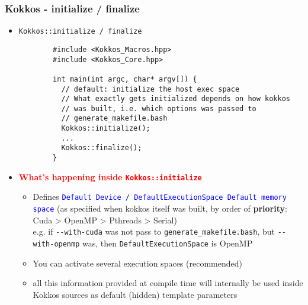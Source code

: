 \begin{frame}[fragile=singleslide]
  \frametitle{Kokkos - initialize / finalize}

  \begin{itemize}
  \item \texttt{Kokkos::initialize / finalize}
    {\small\begin{verbatim}
        #include <Kokkos_Macros.hpp>
        #include <Kokkos_Core.hpp>
        
        int main(int argc, char* argv[]) {
          // default: initialize the host exec space
          // What exactly gets initialized depends on how kokkos
          // was built, i.e. which options was passed to
          // generate_makefile.bash
          Kokkos::initialize();
          ...
          Kokkos::finalize();
        }
      \end{verbatim}
    }
  \item \textcolor{red}{\textbf{What's happening inside \texttt{Kokkos::initialize}}}
    \begin{itemize}
    \item Defines \textcolor{blue}{\texttt{Default Device / DefaultExecutionSpace Default memory space}} (as specified when kokkos itself was built, by order of {\bf priority}: Cuda > OpenMP > Pthreads > Serial)\\
      e.g. if \texttt{\--\--with-cuda} was not pass to \texttt{generate\_makefile.bash}, but \texttt{\--\--with-openmp} was, then \texttt{DefaultExecutionSpace} is OpenMP
    \item You can activate several execution spaces (recommended)
    \item all this information provided at compile time will internally be used inside Kokkos sources as default (hidden) template parameters
    \end{itemize}
  \end{itemize}
\end{frame}

